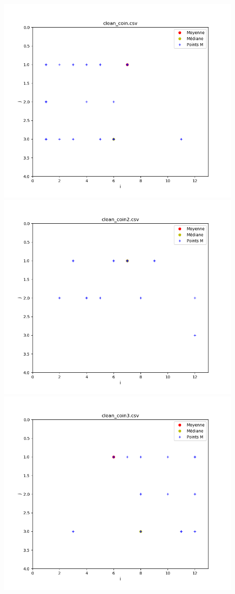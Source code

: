 \documentclass[french, a4paper, 12pt, parskip]{scrartcl}
\begin{document}
\begin{center}
  \includegraphics[width=0.9\textwidth]{finger2-f1.png}
  \includegraphics[width=0.9\textwidth]{finger2-f2.png}
  \includegraphics[width=0.9\textwidth]{finger2-f3.png}

\end{center}
\end{document}
